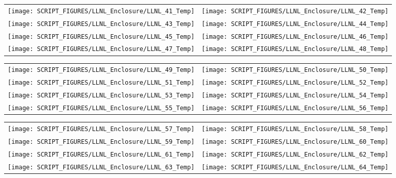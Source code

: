 \begin{figure}[!ht]
\begin{tabular*}{\textwidth}{l@{\extracolsep{\fill}}r}
\texttt{[image: SCRIPT\_FIGURES/LLNL\_Enclosure/LLNL\_41\_Temp]} &
\texttt{[image: SCRIPT\_FIGURES/LLNL\_Enclosure/LLNL\_42\_Temp]} \\
\texttt{[image: SCRIPT\_FIGURES/LLNL\_Enclosure/LLNL\_43\_Temp]} &
\texttt{[image: SCRIPT\_FIGURES/LLNL\_Enclosure/LLNL\_44\_Temp]} \\
\texttt{[image: SCRIPT\_FIGURES/LLNL\_Enclosure/LLNL\_45\_Temp]} &
\texttt{[image: SCRIPT\_FIGURES/LLNL\_Enclosure/LLNL\_46\_Temp]} \\
\texttt{[image: SCRIPT\_FIGURES/LLNL\_Enclosure/LLNL\_47\_Temp]} &
\texttt{[image: SCRIPT\_FIGURES/LLNL\_Enclosure/LLNL\_48\_Temp]}
\end{tabular*}
\label{LLNL_Enclosure_Temp_6}
\end{figure}

\begin{figure}[!ht]
\begin{tabular*}{\textwidth}{l@{\extracolsep{\fill}}r}
\texttt{[image: SCRIPT\_FIGURES/LLNL\_Enclosure/LLNL\_49\_Temp]} &
\texttt{[image: SCRIPT\_FIGURES/LLNL\_Enclosure/LLNL\_50\_Temp]} \\
\texttt{[image: SCRIPT\_FIGURES/LLNL\_Enclosure/LLNL\_51\_Temp]} &
\texttt{[image: SCRIPT\_FIGURES/LLNL\_Enclosure/LLNL\_52\_Temp]} \\
\texttt{[image: SCRIPT\_FIGURES/LLNL\_Enclosure/LLNL\_53\_Temp]} &
\texttt{[image: SCRIPT\_FIGURES/LLNL\_Enclosure/LLNL\_54\_Temp]} \\
\texttt{[image: SCRIPT\_FIGURES/LLNL\_Enclosure/LLNL\_55\_Temp]} &
\texttt{[image: SCRIPT\_FIGURES/LLNL\_Enclosure/LLNL\_56\_Temp]}
\end{tabular*}
\label{LLNL_Enclosure_Temp_7}
\end{figure}

\begin{figure}[!ht]
\begin{tabular*}{\textwidth}{l@{\extracolsep{\fill}}r}
\texttt{[image: SCRIPT\_FIGURES/LLNL\_Enclosure/LLNL\_57\_Temp]} &
\texttt{[image: SCRIPT\_FIGURES/LLNL\_Enclosure/LLNL\_58\_Temp]} \\
\texttt{[image: SCRIPT\_FIGURES/LLNL\_Enclosure/LLNL\_59\_Temp]} &
\texttt{[image: SCRIPT\_FIGURES/LLNL\_Enclosure/LLNL\_60\_Temp]} \\
\texttt{[image: SCRIPT\_FIGURES/LLNL\_Enclosure/LLNL\_61\_Temp]} &
\texttt{[image: SCRIPT\_FIGURES/LLNL\_Enclosure/LLNL\_62\_Temp]} \\
\texttt{[image: SCRIPT\_FIGURES/LLNL\_Enclosure/LLNL\_63\_Temp]} &
\texttt{[image: SCRIPT\_FIGURES/LLNL\_Enclosure/LLNL\_64\_Temp]}
\end{tabular*}
\label{LLNL_Enclosure_Temp_8}
\end{figure}

